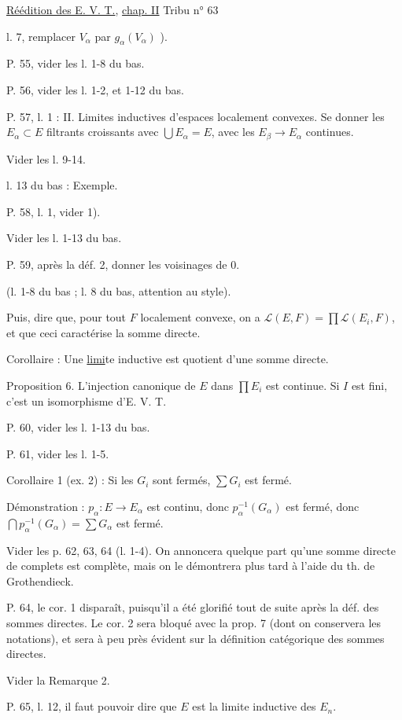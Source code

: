 \uline{Réédition des E. V. T.}, \uline{chap. II} \hfill Tribu n° 63

l. 7, remplacer $V_\alpha$ par $g_\alpha(V_\alpha)$ ).

P. 55, vider les l. 1-8 du bas.

P. 56, vider les l. 1-2, et 1-12 du bas.

P. 57, l. 1 : II. Limites inductives d'espaces localement convexes. Se donner les $E_\alpha\subset E$ filtrants croissants avec $\bigcup E_\alpha=E$, avec les $E_\beta\to E_\alpha$ continues.

Vider les l. 9-14.

l. 13 du bas : Exemple.

P. 58, l. 1, vider 1).

Vider les l. 1-13 du bas.

P. 59, après la déf. 2, donner les voisinages de $0$.

(l. 1-8 du bas ; l. 8 du bas, attention au style).

Puis, dire que, pour tout $F$ localement convexe, on a $\mathscr{L}(E,F)=\prod\mathscr{L}(E_i,F)$, et que ceci caractérise la somme directe.

Corollaire : Une \uline{limi}te inductive est quotient d'une somme directe.

Proposition 6. L'injection canonique de $E$ dans $\prod E_i$ est continue. Si $I$ est fini, c'est un isomorphisme d'E. V. T.

P. 60, vider les l. 1-13 du bas.

P. 61, vider les l. 1-5.

Corollaire 1 (ex. 2) : Si les $G_i$ sont fermés, $\sum G_i$ est fermé.

Démonstration : $p_\alpha:E\to E_\alpha$ est continu, donc $p_\alpha^{-1}(G_\alpha)$ est fermé, donc $\bigcap p_\alpha^{-1}(G_\alpha)=\sum G_\alpha$ est fermé.

Vider les p. 62, 63, 64 (l. 1-4). On annoncera quelque part qu'une somme directe de complets est complète, mais on le démontrera plus tard à l'aide du th. de Grothendieck.

P. 64, le cor. 1 disparaît, puisqu'il a été glorifié tout de suite après la déf. des sommes directes. Le cor. 2 sera bloqué avec la prop. 7 (dont on conservera les notations), et sera à peu près évident sur la définition catégorique des sommes directes.

Vider la Remarque 2.

P. 65, l. 12, il faut pouvoir dire que $E$ est la limite inductive des $E_n$.

